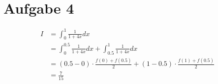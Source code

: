\section*{Aufgabe 4}

\begin{align*}
	I &= \int_0^1 \frac{1}{1+4x} dx\\
    &= \int_0^{0.5} \frac{1}{1+4x} dx +\int_{0.5}^{1} \frac{1}{1+4x} dx\\
    &= (0.5 - 0) \cdot \frac{f(0) + f(0.5)}{2} + (1 - 0.5) \cdot \frac{f(1) + f(0.5)}{2} \\
    &= \frac{7}{15}
\end{align*}
